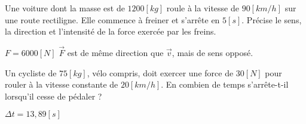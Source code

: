 \begin{exercise}
    Une voiture dont la masse est de \(1200[kg]\) roule à la vitesse de \(90[km/h]\) sur une route rectiligne. Elle commence à freiner et s'arrête en \(5[s]\).
    Précise le sens, la direction et l'intensité de la force exercée par les freins.
\end{exercise}
\begin{solution}
    \(F=6000[N]\)
    \(\vec{F}\) est de même direction que \(\vec{v}\), mais de sens opposé.
\end{solution}


\begin{exercise}
    Un cycliste de \(75[kg]\), vélo compris, doit exercer une force de \(30[N]\) pour rouler à la vitesse constante de \(20[km/h]\). En combien de temps s'arrête-t-il lorsqu'il cesse de pédaler ?
\end{exercise}
\begin{solution}
    \(\Delta t=13,89[s]\)
\end{solution}
